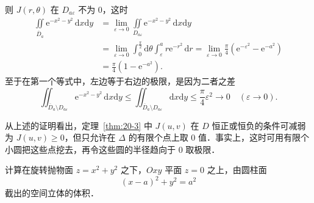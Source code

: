 则 $J(r,\theta)$ 在 $D_{a\varepsilon}$ 不为 $0$，这时
\[
\begin{aligned}
\iint\limits_{\overline{D}_{a}}\mathrm{e}^{-x^{2}-y^{2}}\,\mathrm{d}x\mathrm{d}y&=\lim_{\varepsilon\to 0}\iint\limits_{D_{a\varepsilon}}\mathrm{e}^{-x^{2}-y^{2}}\,\mathrm{d}x\mathrm{d}y\\
&=\lim_{\varepsilon\to 0}\int_{0}^{\frac{\pi}{2}}\mathrm{d}\theta\int_{\varepsilon}^{a}r\mathrm{e}^{-r^{2}}\,\mathrm{d}r=\lim_{\varepsilon\to 0}\frac{\pi}{4}\left(\mathrm{e}^{-\varepsilon^{2}}-\mathrm{e}^{-a^{2}}\right)\\
&=\frac{\pi}{4}(1-\mathrm{e}^{-a^{2}}).
\end{aligned}
\]
至于在第一个等式中，左边等于右边的极限，是因为二者之差
\[
\iint_{\overline{D}_{a}\setminus D_{a\varepsilon}}\mathrm{e}^{-x^{2}-y^{2}}\,\mathrm{d}x\mathrm{d}y\leqslant\iint_{\overline{D}_{a}\setminus D_{a\varepsilon}}\mathrm{d}x\mathrm{d}y\leqslant\frac{\pi}{4}\varepsilon^{2}\to 0\quad(\varepsilon\to 0).
\]

从上述的证明看出，定理~\ref{thm:20-3} 中 $J(u,v)$ 在 $D$ 恒正或恒负的条件可减弱为 $J(u,v)\geqslant 0$，但只允许在 $\Delta$ 的有限个点上取 $0$ 值．事实上，这时可用有限个小圆把这些点挖去，再令这些圆的半径趋向于 $0$ 取极限．

\begin{example}\label{ex:20-3-4}
计算在旋转抛物面 $z=x^{2}+y^{2}$ 之下，$Oxy$ 平面 $z=0$ 之上，由圆柱面
\[
(x-a)^{2}+y^{2}=a^{2}
\]
截出的空间立体的体积．
\end{example}

